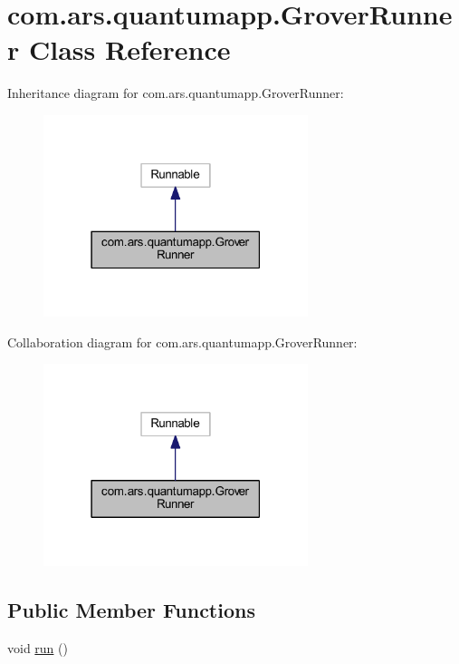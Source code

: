 \hypertarget{classcom_1_1ars_1_1quantumapp_1_1_grover_runner}{}\section{com.\+ars.\+quantumapp.\+Grover\+Runner Class Reference}
\label{classcom_1_1ars_1_1quantumapp_1_1_grover_runner}


Inheritance diagram for com.\+ars.\+quantumapp.\+Grover\+Runner\+:\nopagebreak
\begin{figure}[H]
\begin{center}
\leavevmode
\includegraphics[width=219pt]{classcom_1_1ars_1_1quantumapp_1_1_grover_runner__inherit__graph}
\end{center}
\end{figure}


Collaboration diagram for com.\+ars.\+quantumapp.\+Grover\+Runner\+:\nopagebreak
\begin{figure}[H]
\begin{center}
\leavevmode
\includegraphics[width=219pt]{classcom_1_1ars_1_1quantumapp_1_1_grover_runner__coll__graph}
\end{center}
\end{figure}
\subsection*{Public Member Functions}
\begin{DoxyCompactItemize}
\item 
void \hyperlink{classcom_1_1ars_1_1quantumapp_1_1_grover_runner_a2524c67bd5ad4b1a33d613a4c12be738}{run} ()
\end{DoxyCompactItemize}


